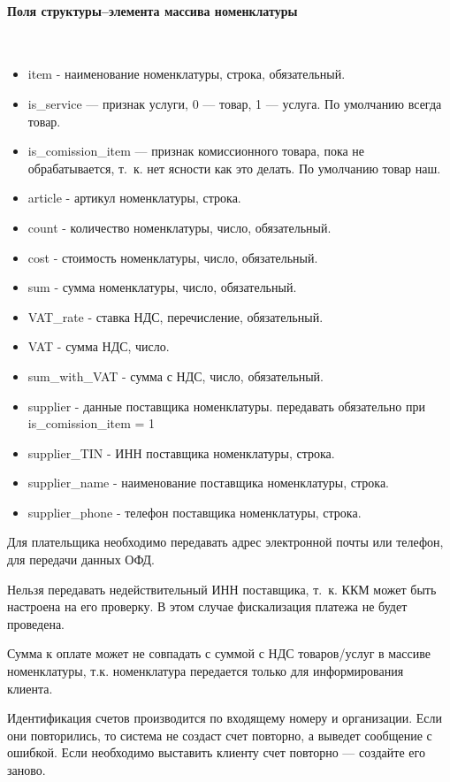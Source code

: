 \documentclass[11pt, a4paper]{article}
\begin{document}
\paragraph{Поля структуры--элемента массива номенклатуры}\

\begin{itemize}
	\item item - наименование номенклатуры, строка, обязательный.
	\item is\_service — признак услуги, 0 — товар, 1 — услуга. По умолчанию всегда товар.
	\item is\_comission\_item — признак комиссионного товара, пока не обрабатывается, т. к. нет ясности как это делать. По умолчанию товар наш.
	\item article - артикул номенклатуры, строка.
	\item count - количество номенклатуры, число, обязательный.
	\item cost - стоимость номенклатуры, число, обязательный.
	\item sum - сумма номенклатуры, число, обязательный.
	\item VAT\_rate - ставка НДС, перечисление, обязательный.
	\item VAT - сумма НДС, число.
	\item sum\_with\_VAT - сумма с НДС, число, обязательный.
	\item supplier - данные поставщика номенклатуры. передавать обязательно при is\_comission\_item = 1
	\item supplier\_TIN - ИНН поставщика номенклатуры, строка.
	\item supplier\_name - наименование поставщика номенклатуры, строка.
	\item supplier\_phone - телефон поставщика номенклатуры, строка.
\end{itemize}

Для плательщика необходимо передавать адрес электронной почты или телефон, для передачи данных ОФД.

Нельзя передавать недействительный ИНН поставщика, т. к. ККМ может быть настроена на его проверку. В этом случае фискализация платежа не будет проведена.

Сумма к оплате может не совпадать с суммой с НДС товаров/услуг в массиве номенклатуры, т.к. номенклатура передается только для информирования клиента.

Идентификация счетов производится по входящему номеру и организации. Если они повторились, то система не создаст счет повторно, а выведет сообщение с ошибкой. Если необходимо выставить клиенту счет повторно — создайте его заново.
\end{document}
